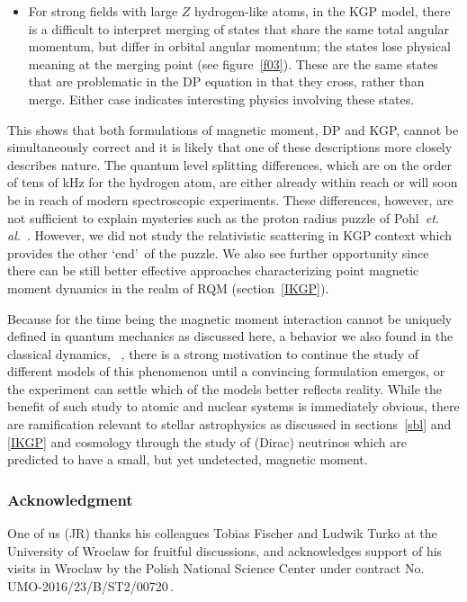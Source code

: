 \documentclass[epj]{svjour}
\begin{document}
\begin{itemize}
\item
For strong fields with large $Z$ hydrogen-like atoms, in the KGP model, there is a difficult to interpret merging of states that share the same total angular momentum, but differ in orbital angular momentum; the states lose physical meaning at the merging point (see figure~\ref{f03}). These are the same states that are problematic in the DP equation in that they cross, rather than merge. Either case indicates interesting physics involving these states.
\end{itemize}

This shows that both formulations of magnetic moment, DP and KGP, cannot be simultaneously correct and it is likely that one of these descriptions more closely describes nature. The quantum level splitting differences, which are on the order of tens of kHz for the hydrogen atom, are either already within reach or will soon be in reach of modern spectroscopic experiments. These differences, however, are not sufficient to explain mysteries such as the proton radius puzzle of Pohl~{\em et. al.}~\cite{Pohl:2013yb}. However, we did not study the relativistic scattering in KGP context which provides the other \lq end\rq\ of the puzzle. We also see further opportunity since there can be still better effective approaches characterizing point magnetic moment dynamics in the realm of RQM (section~\ref{IKGP}).

Because for the time being the magnetic moment interaction cannot be uniquely defined in quantum mechanics as discussed here, a behavior we also found in the classical dynamics, ~\cite{Rafelski:2017hce}, there is a strong motivation to continue the study of different models of this phenomenon until a convincing formulation emerges, or the experiment can settle which of the models better reflects reality. While the benefit of such study to atomic and nuclear systems is immediately obvious, there are ramification relevant to stellar astrophysics as discussed in sections~\ref{sbl} and \ref{IKGP} and cosmology through the study of (Dirac) neutrinos which are predicted \cite{Fujikawa:1980yx} to have a small, but yet undetected, magnetic moment. 

\subsubsection*{Acknowledgment} One of us (JR) thanks his colleagues Tobias Fischer and Ludwik Turko at the University of Wroclaw for fruitful discussions, and acknowledges support of his visits in Wroclaw by the Polish National Science Center under contract No. UMO-2016/23/B/ST2/00720\,.
\end{document}
